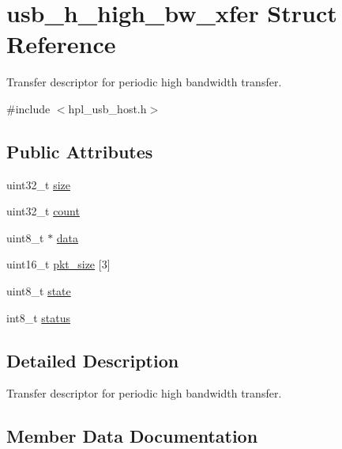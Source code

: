 \hypertarget{structusb__h__high__bw__xfer}{}\section{usb\+\_\+h\+\_\+high\+\_\+bw\+\_\+xfer Struct Reference}
\label{structusb__h__high__bw__xfer}


Transfer descriptor for periodic high bandwidth transfer.  




{\ttfamily \#include $<$hpl\+\_\+usb\+\_\+host.\+h$>$}

\subsection*{Public Attributes}
\begin{DoxyCompactItemize}
\item 
uint32\+\_\+t \hyperlink{structusb__h__high__bw__xfer_a6efee2f56cd3cc8d34593e0066e160d0}{size}
\item 
uint32\+\_\+t \hyperlink{structusb__h__high__bw__xfer_afa653955a04dc03f0c289541ba1c52f6}{count}
\item 
uint8\+\_\+t $\ast$ \hyperlink{structusb__h__high__bw__xfer_a4f04345c3b5afa5e79f262d782dec666}{data}
\item 
uint16\+\_\+t \hyperlink{structusb__h__high__bw__xfer_ab4b010231dbae57057fc7de97db477a4}{pkt\+\_\+size} \mbox{[}3\mbox{]}
\item 
uint8\+\_\+t \hyperlink{structusb__h__high__bw__xfer_a38b78fbacb96309483a203d9ecc22068}{state}
\item 
int8\+\_\+t \hyperlink{structusb__h__high__bw__xfer_aef5852c090bbad1ecf9acc1fe82f8ca6}{status}
\end{DoxyCompactItemize}


\subsection{Detailed Description}
Transfer descriptor for periodic high bandwidth transfer. 

\subsection{Member Data Documentation}
\mbox{\label{structusb__h__high__bw__xfer_afa653955a04dc03f0c289541ba1c52f6}} 
